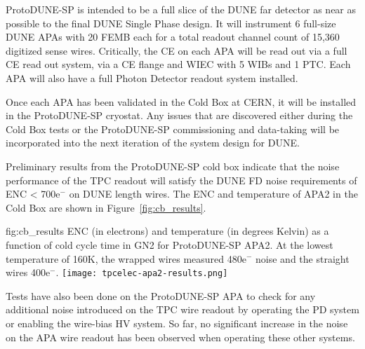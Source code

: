 ProtoDUNE-SP is intended to be a full slice of the DUNE far detector as near as possible to the final DUNE Single Phase design. It will instrument 6 full-size DUNE APAs with 20 FEMB each for a total readout channel count of 15,360 digitized sense wires. Critically, the CE on each APA will be read out via a full CE read out system, via a CE flange and WIEC with 5 WIBs and 1 PTC. Each APA will also have a full Photon Detector readout system installed.

Once each APA has been validated in the Cold Box at CERN, it will be installed in the ProtoDUNE-SP cryostat. Any issues that are discovered either during the Cold Box tests or the ProtoDUNE-SP commissioning and data-taking will be incorporated into the next iteration of the system design for DUNE.

Preliminary results from the ProtoDUNE-SP cold box indicate that the noise performance of the TPC readout will satisfy the DUNE FD noise requirements of ENC < 700e$^-$ on DUNE length wires. The ENC and temperature of APA2 in the Cold Box are shown in Figure~\ref{fig:cb_results}.

\begin{dunefigure}
{fig:cb_results}
{ENC (in electrons) and temperature (in degrees Kelvin) as a function of cold cycle time in GN2 for ProtoDUNE-SP APA2. At the lowest temperature of 160K, the wrapped wires measured 480e$^-$ noise and the straight wires 400e$^-$.}
\texttt{[image: tpcelec-apa2-results.png]}
\end{dunefigure}

Tests have also been done on the ProtoDUNE-SP APA to check for any additional noise introduced on the TPC wire readout by operating the PD system or enabling the wire-bias HV system. So far, no significant increase in the noise on the APA wire readout has been observed when operating these other systems.
